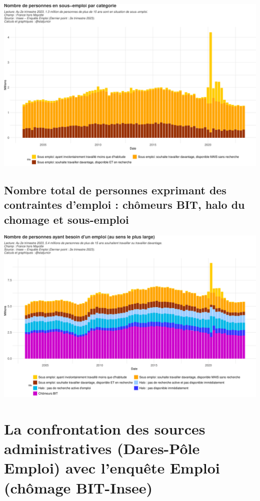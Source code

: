 \documentclass[
  paper=a4,
  ,captions=tableheading
]{scrartcl}
\begin{document}
\includegraphics{rapport_activite_emploi_chomage_insee_files/figure-latex/unnamed-chunk-29-1.pdf}

\hypertarget{nombre-total-de-personnes-exprimant-des-contraintes-demploi-chuxf4meurs-bit-halo-du-chomage-et-sous-emploi}{%
\subsection{Nombre total de personnes exprimant des contraintes d'emploi
: chômeurs BIT, halo du chomage et
sous-emploi}\label{nombre-total-de-personnes-exprimant-des-contraintes-demploi-chuxf4meurs-bit-halo-du-chomage-et-sous-emploi}}

\includegraphics{rapport_activite_emploi_chomage_insee_files/figure-latex/unnamed-chunk-30-1.pdf}

\hypertarget{la-confrontation-des-sources-administratives-dares-puxf4le-emploi-avec-lenquuxeate-emploi-chuxf4mage-bit-insee}{%
\section{La confrontation des sources administratives (Dares-Pôle
Emploi) avec l'enquête Emploi (chômage
BIT-Insee)}\label{la-confrontation-des-sources-administratives-dares-puxf4le-emploi-avec-lenquuxeate-emploi-chuxf4mage-bit-insee}}
\end{document}
